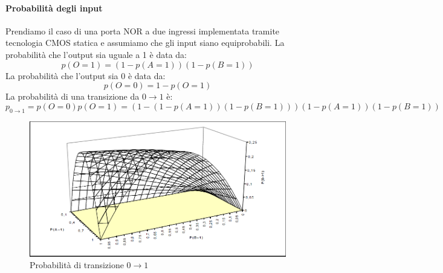 \paragraph{Probabilità degli input}
Prendiamo il caso di una porta NOR a due ingressi implementata tramite tecnologia CMOS statica e assumiamo che gli input siano equiprobabili.
La probabilità che l'output sia uguale a 1 è data da:
$$p(O = 1) = (1-p(A = 1))(1-p(B = 1))$$
La probabilità che l'output sia 0 è data da:
$$p(O = 0) = 1 - p(O = 1)$$
La probabilità di una transizione da $0 \rightarrow 1$ è:
$$p_{0 \rightarrow 1} = p (O = 0)p(O = 1)=
(1-(1-p(A = 1))(1-p(B = 1)))(1-p(A = 1))(1 - p(B = 1))$$
\begin{figure}[hbt]
\centering
\includegraphics[scale=0.7]{img/p01.png}
\caption{Probabilità di transizione $0 \rightarrow 1$}
\end{figure}
